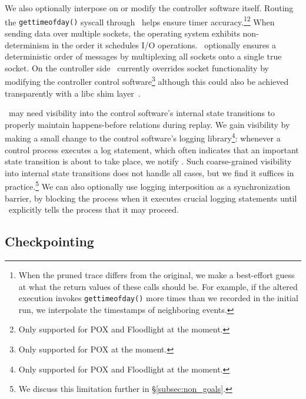 We also optionally interpose on or modify the controller software itself.
Routing the {\tt gettimeofday()} syscall through \projectname~helps ensure timer accuracy.\footnote{When the pruned trace differs from the original, we make a
best-effort guess at what the return values of these calls should be. For example,
if the altered execution invokes {\tt gettimeofday()} more times than we recorded
in the initial run, we interpolate the timestamps of neighboring events.}\footnote{Only
supported for POX and Floodlight at the moment.}
When sending data over multiple sockets, the operating system exhibits
non-determinism in the order it schedules I/O operations.
\projectname~optionally ensures a deterministic order of messages
by multiplexing all sockets
onto a single true socket. On the controller side \projectname~currently
overrides socket functionality by modifying the controller control
software\footnote{Only supported for POX at the moment.} although this
could also be achieved transparently with a libc shim layer~\cite{Geels:2006:RDD:1267359.1267386}.

\projectname~may need visibility into the control software's internal state
transitions to properly maintain happens-before relations during replay. We
gain visibility by making a
small change to the control software's logging library\footnote{Only supported
for POX and Floodlight at the moment.}: whenever a control process executes a log
statement, which often indicates that an important state transition is about to take
place, we notify \projectname. Such coarse-grained visibility into internal
state transitions does not handle all cases, but we find it suffices in practice.\footnote{We discuss this limitation further in \S\ref{subsec:non_goals}.}
We can also optionally use
logging interposition as a
synchronization barrier, by blocking the process when it executes crucial logging statements
until \projectname~explicitly tells the process that it may proceed.


\subsection{Checkpointing}
\label{subsec:snapshotting}

